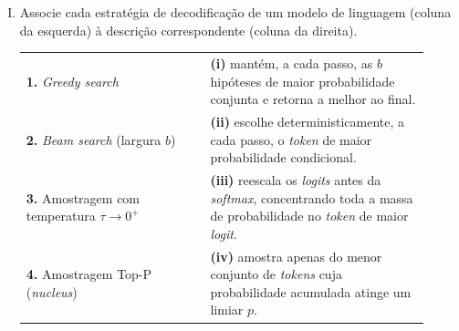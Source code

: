 \documentclass{dlproblemset}
\begin{document}
\begin{enumerate}[I)]
\begin{enumerate}[a)]
    \item ``O sol brilha'' é selecionada porque ``sol'' mantém a maior probabilidade em cada passo isolado; nesse exemplo o \textit{greedy} e o \textit{beam search} coincidem na escolha.
    \item ``O céu azul'' vence no \textit{beam search}, pois $0.50 \times 0.40 = 0.20$ é maior que $0.45 \times 0.90$; o \textit{greedy} e o \textit{beam} concordam nessa escolha.
    \item O \textit{beam search} maximiza a soma das probabilidades ($0.45 + 0.90 = 1.35$) e por isso escolhe ``O sol brilha''; o produto das probabilidades da sequência não é levado em conta.
    \item ``O mar calmo'' é selecionada, pois o \textit{beam search} prioriza \textit{tokens} de baixa probabilidade no primeiro passo para aumentar a diversidade da geração.
    \item ``O sol brilha'' é selecionada: sua probabilidade conjunta ($0.45 \times 0.90 = 0.405$) supera as demais; o \textit{greedy} compromete-se com ``céu'' por ser localmente mais provável e perde a melhor sequência.
    \item Nenhuma sequência pode ser escolhida sem antes normalizar pela penalidade de comprimento, pois sem normalização as probabilidades conjuntas das sequências não são comparáveis.
\end{enumerate}

\item Associe cada estratégia de decodificação de um modelo de linguagem (coluna da esquerda) à descrição correspondente (coluna da direita).

\begin{center}
{\renewcommand{\arraystretch}{1.4}
\begin{tabular}{p{0.42\linewidth} p{0.5\linewidth}}
\textbf{1.} \textit{Greedy search} & \textbf{(i)} mantém, a cada passo, as $b$ hipóteses de maior probabilidade conjunta e retorna a melhor ao final. \\
\textbf{2.} \textit{Beam search} (largura $b$) & \textbf{(ii)} escolhe deterministicamente, a cada passo, o \textit{token} de maior probabilidade condicional. \\
\textbf{3.} Amostragem com temperatura $\tau \to 0^{+}$ & \textbf{(iii)} reescala os \textit{logits} antes da \textit{softmax}, concentrando toda a massa de probabilidade no \textit{token} de maior \textit{logit}. \\
\textbf{4.} Amostragem Top-P (\textit{nucleus}) & \textbf{(iv)} amostra apenas do menor conjunto de \textit{tokens} cuja probabilidade acumulada atinge um limiar $p$. \\
\end{tabular}}
\end{center}


\end{enumerate}
\end{document}
